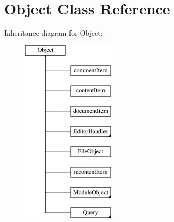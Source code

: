 \hypertarget{classObject}{\section{Object Class Reference}
\label{classObject}
}
Inheritance diagram for Object\+:\begin{figure}[H]
\begin{center}
\leavevmode
\includegraphics[height=9.000000cm]{classObject}
\end{center}
\end{figure}
